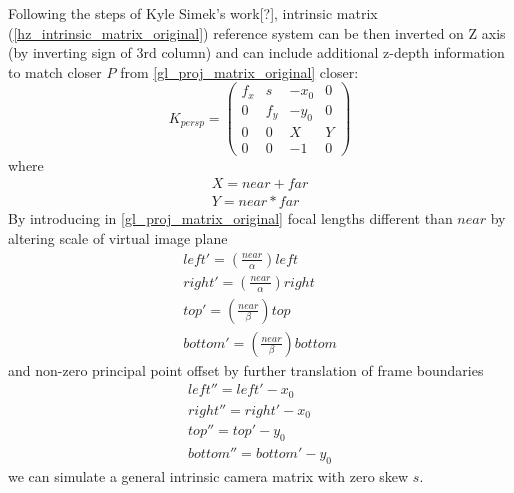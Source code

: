 Following the steps of Kyle Simek's work[?], intrinsic matrix (\ref{hz_intrinsic_matrix_original}) reference system can be then inverted on Z axis (by inverting sign of 3rd column) and can include additional z-depth information to match closer $P$ from \ref{gl_proj_matrix_original} closer:
\begin{equation}
K_{persp} = \left( \begin{array}{cccc} f_x & s & -x_0 & 0 \\ 0 & f_y & -y_0 & 0 \\ 0 & 0 & X & Y \\ 0 & 0 & -1 & 0 \end{array} \right)
\label{hz_intrinsic_matrix_extended}
\end{equation}
where
\begin{equation}
\begin{array}{c}
X = near + far \\
Y = near * far
\end{array}
\label{hz_intrinsic_matrix_extended_details}
\end{equation}
By introducing in \ref{gl_proj_matrix_original} focal lengths different than $near$ by altering scale of virtual image plane
\begin{equation}
\begin{array}{c}
left' = (\frac{near}{\alpha}) left \\
right' = (\frac{near}{\alpha}) right \\
top' = (\frac{near}{\beta}) top \\
bottom' = (\frac{near}{\beta}) bottom
\end{array}
\label{near_alter_scale}
\end{equation}
and non-zero principal point offset by further translation of frame boundaries
\begin{equation}
\begin{array}{c}
left'' = left' - x_0 \\
right'' = right' - x_0 \\
top'' = top' - y_0 \\
bottom'' = bottom' - y_0
\end{array}
\label{near_alter_offset}
\end{equation}
we can simulate a general intrinsic camera matrix with zero skew $s$.

